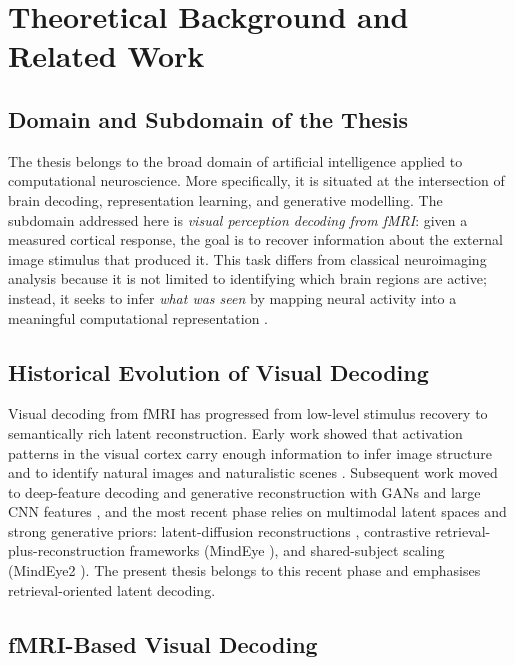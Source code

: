 
\chapter{Theoretical Background and Related Work}
\label{chap:background}

\section{Domain and Subdomain of the Thesis}

The thesis belongs to the broad domain of artificial intelligence applied to computational neuroscience. More specifically, it is situated at the intersection of brain decoding, representation learning, and generative modelling. The subdomain addressed here is \emph{visual perception decoding from fMRI}: given a measured cortical response, the goal is to recover information about the external image stimulus that produced it. This task differs from classical neuroimaging analysis because it is not limited to identifying which brain regions are active; instead, it seeks to infer \emph{what was seen} by mapping neural activity into a meaningful computational representation \cite{Kay2008,Naselaris2009}.

\section{Historical Evolution of Visual Decoding}

Visual decoding from fMRI has progressed from low-level stimulus recovery to semantically rich latent reconstruction. Early work showed that activation patterns in the visual cortex carry enough information to infer image structure and to identify natural images and naturalistic scenes \cite{Thirion2006,Kay2008,Naselaris2009,Nishimoto2011}. Subsequent work moved to deep-feature decoding and generative reconstruction with GANs and large CNN features \cite{Horikawa2017,Wen2018,Seeliger2018,Shen2019,VanRullen2019}, and the most recent phase relies on multimodal latent spaces and strong generative priors: latent-diffusion reconstructions \cite{Takagi2023,Ozcelik2023}, contrastive retrieval-plus-reconstruction frameworks (MindEye \cite{Scotti2023}), and shared-subject scaling (MindEye2 \cite{Scotti2024}). The present thesis belongs to this recent phase and emphasises retrieval-oriented latent decoding.

\section{fMRI-Based Visual Decoding}

